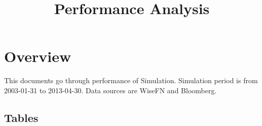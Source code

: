 \documentclass{article}
\begin{document}




\title{Performance Analysis}
\author{}
\date{}

\maketitle


\section{Overview}
This documents go through performance of Simulation. Simulation period is from 2003-01-31 to 2013-04-30. Data sources are WiseFN and Bloomberg.

\subsection{Tables}
\end{document}

